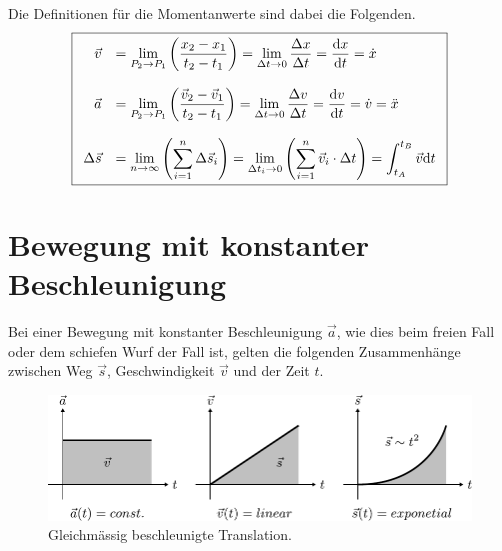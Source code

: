 \noindent
Die Definitionen für die Momentanwerte sind dabei die Folgenden.
\[\boxed{\begin{array}{r l}
	\vec{v}	&
		= \displaystyle \lim\limits_{P_2 \rightarrow P_1} 
			{\left( \frac{x_2 - x_1}{t_2 - t_1} \right)}
		= \displaystyle \lim\limits_{\Delta t \rightarrow 0}
			{\frac{\Delta x}{\Delta t}}
		= \displaystyle \frac{\mathrm{d}x}{\mathrm{d}t}=\dot{x} \\
	& \\
	\vec{a} &
		= \displaystyle \lim\limits_{P_2 \rightarrow P_1}
			{\left( \frac{\vec{v}_2 
			- \vec{v}_1}{t_2 - t_1} \right)}
		= \displaystyle \lim\limits_{\Delta t \rightarrow 0}
			{\frac{\Delta v}{\Delta t}}
		= \displaystyle \frac{\mathrm{d}v}{\mathrm{d}t}
		= \displaystyle \dot{v}
		= \ddot{x} \\
	& \\
	\Delta \vec{s} &
		= \displaystyle \lim\limits_{n \rightarrow \infty}
			{\left( \sum_{i=1}^{n} \Delta \vec{s}_i \right)}
		= \displaystyle \lim\limits_{\Delta t_i \rightarrow 0}
			{\left(
				\sum^{n}_{i=1}\vec{v}_i\cdot\Delta t
			\right)}
		= \displaystyle \int_{t_A}^{t_B}\vec{v}\mathrm{d}t
\end{array}}\]

\section{Bewegung mit konstanter Beschleunigung}
Bei einer Bewegung mit konstanter Beschleunigung $\vec{a}$, wie dies beim
freien Fall oder dem schiefen Wurf der Fall ist, gelten die folgenden
Zusammenhänge zwischen Weg $\vec{s}$, Geschwindigkeit $\vec{v}$ und 
der Zeit $t$.

\begin{figure}[h!]
	\centering
	\includegraphics[scale=0.7]{../fig/bewegung.pdf}
	\caption{Gleichmässig beschleunigte Translation.}
	\label{fig:bewegung}
\end{figure}

